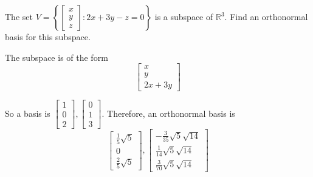 \documentclass{ximera}
\begin{document}
\begin{problem} The set $V =  \left\{ \left[
\begin{array}{r}
 x \\
y \\
z
\end{array}
\right] :2x+3y-z=0\right\} $ is
a subspace of $\mathbb{R}^{3}.$ Find an orthonormal basis for this subspace.
\begin{hint}
The subspace is of the form
\[
\left[
\begin{array}{c}
x \\
y \\
2x+3y
\end{array}
\right]
\]

So a basis is $\left[
\begin{array}{c}
1 \\
0 \\
2
\end{array}
\right] ,\left[
\begin{array}{c}
0 \\
1 \\
3
\end{array}
\right] $. Therefore, an orthonormal basis is
\[
\left[
\begin{array}{c}
\frac{1}{5}\sqrt{5} \\
0 \\
\frac{2}{5}\sqrt{5}
\end{array}
\right] ,\left[
\begin{array}{c}
-\frac{3}{35}\sqrt{5}\sqrt{14} \\
\frac{1}{14}\sqrt{5}\sqrt{14} \\
\frac{3}{70}\sqrt{5}\sqrt{14}
\end{array}
\right]
\]
\end{hint}
\end{problem}
\end{document}
